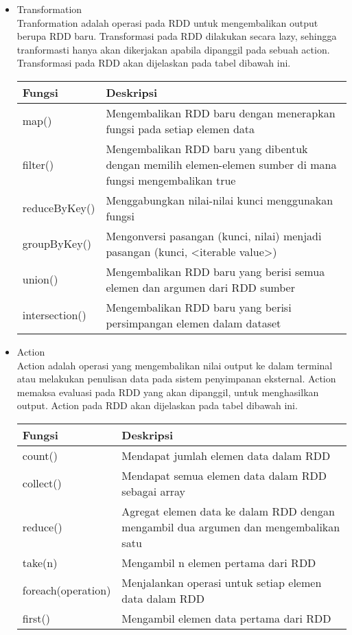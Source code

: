 \begin{itemize}
\item Transformation\\
Tranformation adalah operasi pada RDD untuk mengembalikan output berupa RDD baru. Transformasi pada RDD dilakukan secara lazy, sehingga tranformasti hanya akan dikerjakan apabila dipanggil pada sebuah action. Transformasi pada RDD akan dijelaskan pada tabel dibawah ini.\\

\begin{tabular}{|l|p{10cm}|}
\hline 
\rule[-1ex]{0pt}{2.5ex} Fungsi & Deskripsi \\ 
\hline 
\rule[-1ex]{0pt}{2.5ex} map()	 & Mengembalikan RDD baru dengan menerapkan fungsi pada setiap elemen data \\ 
\hline 
\rule[-1ex]{0pt}{2.5ex} filter() & Mengembalikan RDD baru yang dibentuk dengan memilih elemen-elemen sumber di mana fungsi mengembalikan true \\ 
\hline 
\rule[-1ex]{0pt}{2.5ex} reduceByKey() & Menggabungkan nilai-nilai kunci menggunakan fungsi \\ 
\hline 
\rule[-1ex]{0pt}{2.5ex} groupByKey() & Mengonversi pasangan (kunci, nilai) menjadi pasangan (kunci, <iterable value>) \\ 
\hline 
\rule[-1ex]{0pt}{2.5ex} union() & Mengembalikan RDD baru yang berisi semua elemen dan argumen dari RDD sumber \\ 
\hline 
\rule[-1ex]{0pt}{2.5ex} intersection() & Mengembalikan RDD baru yang berisi persimpangan elemen dalam dataset \\ 
\hline 
\end{tabular} 

\item Action\\
Action adalah operasi yang mengembalikan nilai output ke dalam terminal atau melakukan penulisan data pada sistem penyimpanan eksternal. Action memaksa evaluasi pada RDD yang akan dipanggil, untuk menghasilkan output. Action pada RDD akan dijelaskan pada tabel dibawah ini.\\

\begin{tabular}{|l|p{10cm}|}
\hline 
\rule[-1ex]{0pt}{2.5ex} Fungsi & Deskripsi \\ 
\hline 
\rule[-1ex]{0pt}{2.5ex} count() & Mendapat jumlah elemen data dalam RDD \\ 
\hline 
\rule[-1ex]{0pt}{2.5ex} collect() & Mendapat semua elemen data dalam RDD sebagai array \\ 
\hline 
\rule[-1ex]{0pt}{2.5ex} reduce() & Agregat elemen data ke dalam RDD dengan mengambil dua argumen dan mengembalikan satu \\ 
\hline 
\rule[-1ex]{0pt}{2.5ex} take(n) & Mengambil n elemen pertama dari RDD \\ 
\hline 
\rule[-1ex]{0pt}{2.5ex} foreach(operation) & Menjalankan operasi untuk setiap elemen data dalam RDD \\ 
\hline 
\rule[-1ex]{0pt}{2.5ex} first() & Mengambil elemen data pertama dari RDD \\ 
\hline 
\end{tabular} 
\end{itemize}
 

